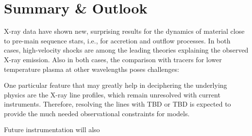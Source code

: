 
\section{Summary \& Outlook}

X-ray data have shown new, surprising results for the dynamics of material close to pre-main sequence stars, i.e., for accretion and outflow processes. In both cases, high-velocity shocks are among the leading theories explaining the observed X-ray emission. Also in both cases, the comparison with tracers for lower temperature plasma at other wavelengths poses challenges: 

One particular feature that may greatly help in deciphering the underlying physics are the X-ray line profiles, which remain unresolved with current instruments. Therefore, resolving the lines with TBD or TBD is expected to provide the much needed observational constraints for models.

Future instrumentation will also
